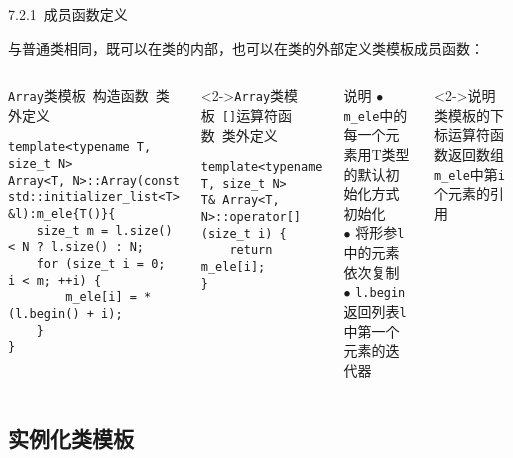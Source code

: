 \begin{frame}[fragile]{7.2.1~成员函数定义}

与普通类相同，既可以在类的内部，也可以在\alert{类的外部}定义\alert{类模板成员函数}：

\vspace{-4mm}

\begin{columns}[t]

\begin{blueblock}{\texttt{Array}类模板~构造函数~类外定义}
\vspace{-2mm}
\begin{lstlisting}[moreemph={T,Array,initializer}]
template<typename T, size_t N>
Array<T, N>::Array(const std::initializer_list<T> &l):m_ele{T()}{
    size_t m = l.size() < N ? l.size() : N;
    for (size_t i = 0; i < m; ++i) {
        m_ele[i] = *(l.begin() + i);
    }
}
\end{lstlisting}
\end{blueblock}
\begin{blueblock}<2->{\texttt{Array}类模板~\texttt{[]}运算符函数~类外定义}
\vspace{-2mm}
\begin{lstlisting}[moreemph={T,Array}]
template<typename T, size_t N>
T& Array<T, N>::operator[](size_t i) {
    return m_ele[i];
}
\end{lstlisting}
\end{blueblock}

\begin{yellowblock}{说明}
$\bullet$ \texttt{m\_ele}中的每一个元素用T类型的默认初始化方式初始化\\
$\bullet$ 将形参\texttt{l}中的元素依次复制\\
$\bullet$ \texttt{l.begin}返回列表\texttt{l}中第一个元素的迭代器
\end{yellowblock}
\begin{yellowblock}<2->{说明}
类模板的下标运算符函数返回数组\texttt{m\_ele}中第\texttt{i}个元素的引用
\end{yellowblock}

\end{columns}

\end{frame}


\subsection{实例化类模板}

